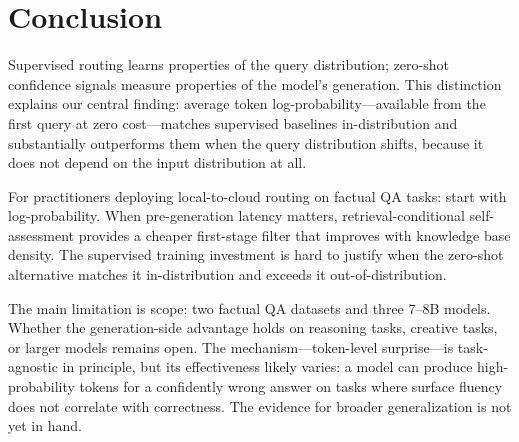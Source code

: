 \documentclass[journal]{IEEEtran}
\begin{document}
\section{Conclusion}
\label{sec:conclusion}

Supervised routing learns properties of the query distribution; zero-shot confidence signals measure properties of the model's generation. This distinction explains our central finding: average token log-probability---available from the first query at zero cost---matches supervised baselines in-distribution and substantially outperforms them when the query distribution shifts, because it does not depend on the input distribution at all.

For practitioners deploying local-to-cloud routing on factual QA tasks: start with log-probability. When pre-generation latency matters, retrieval-conditional self-assessment provides a cheaper first-stage filter that improves with knowledge base density. The supervised training investment is hard to justify when the zero-shot alternative matches it in-distribution and exceeds it out-of-distribution.

The main limitation is scope: two factual QA datasets and three 7--8B models. Whether the generation-side advantage holds on reasoning tasks, creative tasks, or larger models remains open. The mechanism---token-level surprise---is task-agnostic in principle, but its effectiveness likely varies: a model can produce high-probability tokens for a confidently wrong answer on tasks where surface fluency does not correlate with correctness. The evidence for broader generalization is not yet in hand.
\end{document}
